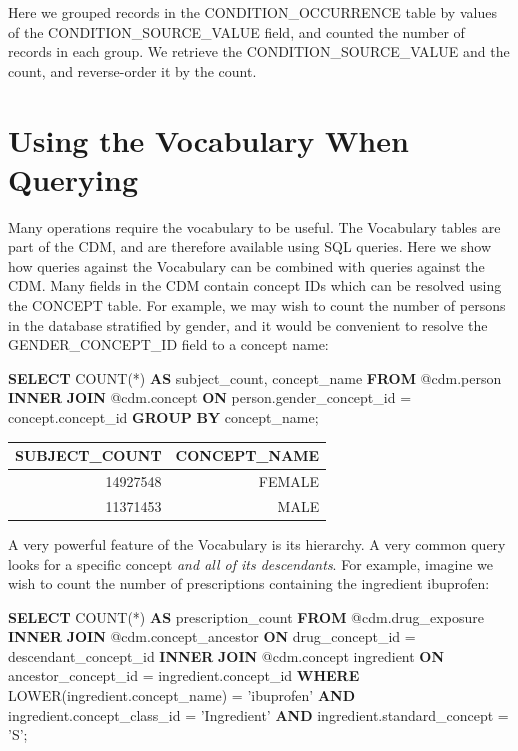 \documentclass[11pt]{book}
\newenvironment{Shaded}{\begin{snugshade}}{\end{snugshade}}
\newcommand{\KeywordTok}[1]{\textcolor[rgb]{0.13,0.29,0.53}{\textbf{#1}}}
\newcommand{\StringTok}[1]{\textcolor[rgb]{0.31,0.60,0.02}{#1}}
\newcommand{\FunctionTok}[1]{\textcolor[rgb]{0.00,0.00,0.00}{#1}}
\newcommand{\NormalTok}[1]{#1}
\theoremstyle{definition}
\theoremstyle{definition}
\theoremstyle{definition}
\theoremstyle{remark}
\begin{document}
Here we grouped records in the CONDITION\_OCCURRENCE table by values of
the CONDITION\_SOURCE\_VALUE field, and counted the number of records in
each group. We retrieve the CONDITION\_SOURCE\_VALUE and the count, and
reverse-order it by the count.

\section{Using the Vocabulary When
Querying}\label{using-the-vocabulary-when-querying}

Many operations require the vocabulary to be useful. The Vocabulary
tables are part of the CDM, and are therefore available using SQL
queries. Here we show how queries against the Vocabulary can be combined
with queries against the CDM. Many fields in the CDM contain concept IDs
which can be resolved using the CONCEPT table. For example, we may wish
to count the number of persons in the database stratified by gender, and
it would be convenient to resolve the GENDER\_CONCEPT\_ID field to a
concept name:

\begin{Shaded}
\begin{Highlighting}[]
\KeywordTok{SELECT} \FunctionTok{COUNT}\NormalTok{(*) }\KeywordTok{AS}\NormalTok{ subject_count,}
\NormalTok{  concept_name}
\KeywordTok{FROM}\NormalTok{ @cdm.person}
\KeywordTok{INNER} \KeywordTok{JOIN}\NormalTok{ @cdm.concept}
  \KeywordTok{ON}\NormalTok{ person.gender_concept_id = concept.concept_id}
\KeywordTok{GROUP} \KeywordTok{BY}\NormalTok{ concept_name;}
\end{Highlighting}
\end{Shaded}

\begin{longtable}[]{@{}rr@{}}
\toprule
SUBJECT\_COUNT & CONCEPT\_NAME\tabularnewline
\midrule
\endhead
14927548 & FEMALE\tabularnewline
11371453 & MALE\tabularnewline
\bottomrule
\end{longtable}

A very powerful feature of the Vocabulary is its hierarchy. A very
common query looks for a specific concept \emph{and all of its
descendants}. For example, imagine we wish to count the number of
prescriptions containing the ingredient ibuprofen:

\begin{Shaded}
\begin{Highlighting}[]
\KeywordTok{SELECT} \FunctionTok{COUNT}\NormalTok{(*) }\KeywordTok{AS}\NormalTok{ prescription_count}
\KeywordTok{FROM}\NormalTok{ @cdm.drug_exposure}
\KeywordTok{INNER} \KeywordTok{JOIN}\NormalTok{ @cdm.concept_ancestor}
  \KeywordTok{ON}\NormalTok{ drug_concept_id = descendant_concept_id}
\KeywordTok{INNER} \KeywordTok{JOIN}\NormalTok{ @cdm.concept ingredient}
  \KeywordTok{ON}\NormalTok{ ancestor_concept_id = ingredient.concept_id}
\KeywordTok{WHERE} \FunctionTok{LOWER}\NormalTok{(ingredient.concept_name) = }\StringTok{'ibuprofen'}
  \KeywordTok{AND}\NormalTok{ ingredient.concept_class_id = }\StringTok{'Ingredient'}
  \KeywordTok{AND}\NormalTok{ ingredient.standard_concept = }\StringTok{'S'}\NormalTok{;}
\end{Highlighting}
\end{Shaded}
\end{document}
